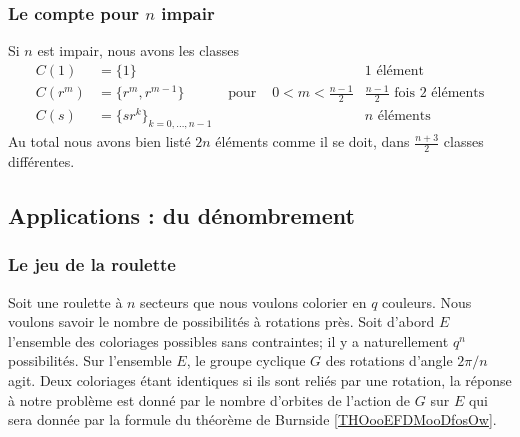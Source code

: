 \subsubsection{Le compte pour $ n$ impair}
\label{GJIzDEP}

Si \( n\) est impair, nous avons les classes
\begin{subequations}
    \begin{align}
        C(1)&=\{ 1 \}       &&& 1\text{ élément}\\
        C(r^m)&=\{ r^m,r^{m-1} \}&\text{ pour }&0<m<\frac{ n-1 }{2}   & \frac{ n-1 }{2}\text{ fois } 2\text{ éléments}\\
        C(s)&=\{ sr^k \}_{k=0,\ldots, n-1} &&&  n\text{ éléments}
    \end{align}
\end{subequations}
Au total nous avons bien listé \( 2n\) éléments comme il se doit, dans \(  \frac{ n+3 }{2}\) classes différentes.

\subsection{Applications : du dénombrement}

\subsubsection{Le jeu de la roulette}
\label{pTqJLY}

Soit une roulette à \( n\) secteurs que nous voulons colorier en \( q\) couleurs\cite{HEBOFl}. Nous voulons savoir le nombre de possibilités à rotations près. Soit d'abord \( E\) l'ensemble des coloriages possibles sans contraintes; il y a naturellement \( q^n\) possibilités. Sur l'ensemble \( E\), le groupe cyclique \( G\) des rotations d'angle \( 2\pi/n\) agit. Deux coloriages étant identiques si ils sont reliés par une rotation, la réponse à notre problème est donné par le nombre d'orbites de l'action de \( G\) sur \( E\) qui sera donnée par la formule du théorème de Burnside \ref{THOooEFDMooDfosOw}. 

